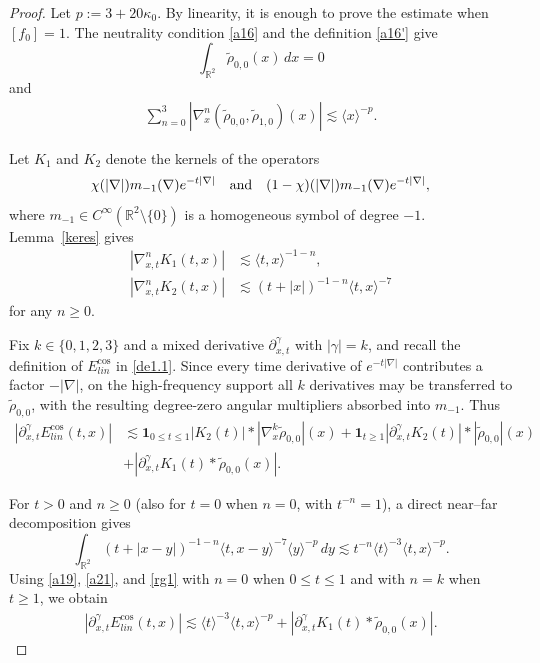 \documentclass[reqno,11pt]{amsart}
\numberwithin{equation}{section}
\def\R{{\mathbb R}}
\def\R{{\bf R}}
\def\R{\mathbb{R}}
\begin{document}
	\begin{proof}
		Let $p:=3+20\kappa_0$. By linearity, it is
		enough to prove the estimate when $[f_0]=1$. The neutrality condition
		\eqref{a16} and the definition \eqref{a16'} give
		\begin{equation}\label{a21.1}
			\int_{\mathbb{R}^2}\tilde\rho_{0,0}(x)\,dx = 0
		\end{equation}
		and
		\begin{align}\label{a21}
			\sum_{n=0}^{3}
			|\nabla_x^n(\tilde\rho_{0,0},\tilde\rho_{1,0})(x)|
			\lesssim \langle x\rangle^{-p}.
		\end{align}
		
		Let $K_1$ and $K_2$ denote the kernels of the operators
		\[
		\chi(|\nabla|)m_{-1}(\nabla)e^{-t|\nabla|}
		\quad\hbox{and}\quad(1-\chi)(|\nabla|)m_{-1}(\nabla)e^{-t|\nabla|},
		\]
		where $m_{-1}\in C^\infty(\R^2\setminus\{0\})$ is a homogeneous symbol of degree $-1$. Lemma~\ref{keres} gives
		\begin{align}\label{a20}
			|\nabla^n_{x,t}K_1(t,x)|&\lesssim \langle t,x\rangle^{-1-n},\\
			\label{a19}|\nabla^n_{x,t}K_2(t,x)|&\lesssim (t+|x|)^{-1-n}\langle t,x\rangle^{-7}
		\end{align}
		for any $n\geq 0$. 
		
		Fix $k\in\{0,1,2,3\}$ and a mixed derivative $\partial_{x,t}^{\gamma}$ with $|\gamma|=k$, and recall the definition of $E_{{lin}}^{\cos}$ in \eqref{de1.1}. Since every time derivative of \(e^{-t|\nabla|}\) contributes a factor \(-|\nabla|\), on the high-frequency support all \(k\) derivatives may be transferred to \(\widetilde\rho_{0,0}\), with the resulting degree-zero angular multipliers absorbed into \(m_{-1}\). Thus
		\begin{align*}
			|\partial_{x,t}^{\gamma}E_{lin}^{\cos}(t,x)|&\lesssim\mathbf 1_{0\leq t\leq1}|K_2(t)|*|\nabla_x^k\tilde\rho_{0,0}|(x)+
			\mathbf 1_{t\geq1}|\partial_{x,t}^{\gamma}K_2(t)|*|\tilde\rho_{0,0}|(x)\\
			&+|\partial_{x,t}^{\gamma}K_1(t)*\tilde\rho_{0,0}(x)|.
		\end{align*}
		
		For $t>0$ and $n\geq0$ (also for $t=0$ when $n=0$, with $t^{-n}=1$), a direct near--far decomposition gives
		\begin{equation}\label{rg1}
			\int_{\mathbb{R}^2}(t+|x-y|)^{-1-n}
			\langle t,x-y\rangle^{-7}\langle y\rangle^{-p}\,dy
			\lesssim t^{-n}\langle t\rangle^{-3}
			\langle t,x\rangle^{-p}.
		\end{equation}
		Using \eqref{a19}, \eqref{a21}, and \eqref{rg1} with $n=0$ when
		$0\leq t\leq1$ and with $n=k$ when $t\geq1$, we obtain
		\begin{align}\label{a22}
			|\partial_{x,t}^{\gamma}E_{{lin}}^{\cos}(t,x)|
			\lesssim\langle t\rangle^{-3}\langle t,x\rangle^{-p}+|\partial_{x,t}^{\gamma}K_1(t)*\tilde\rho_{0,0}(x)|.
		\end{align}


\end{proof}
\end{document}
